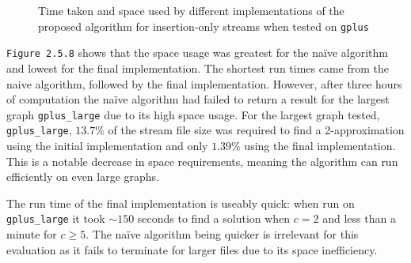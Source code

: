 \documentclass[11pt,twoside,a4paper]{report}
\begin{document}
\begin{figure}[H]
	\label{Figure 12}
	\caption{Time taken and space used by different implementations of the proposed algorithm for insertion-only streams when tested on \texttt{gplus}}
\end{figure}

\par \texttt{Figure 2.5.8} shows that the space usage was greatest for the naïve algorithm and lowest for the final implementation. The shortest run times came from the naive algorithm, followed by the final implementation. However, after three hours of computation the naïve algorithm had failed to return a result for the largest graph \texttt{gplus\_large} due to its high space usage. For the largest graph tested, \texttt{gplus\_large}, $13.7\%$ of the stream file size was required to find a 2-approximation using the initial implementation and only $1.39\%$ using the final implementation. This is a notable decrease in space requirements, meaning the algorithm can run efficiently on even large graphs.

\par The run time of the final implementation is useably quick: when run on \texttt{gplus\_large} it took $\sim\!\!150$ seconds to find a solution when $c=2$ and less than a minute for $c\geq5$. The naïve algorithm being quicker is irrelevant for this evaluation as it fails to terminate for larger files due to its space inefficiency.
\end{document}
